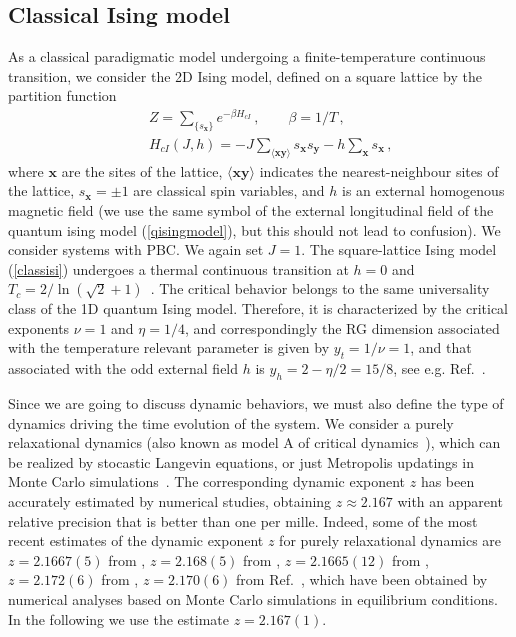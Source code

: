 \subsection{Classical Ising model}
\label{classmod}

As a classical paradigmatic model undergoing a finite-temperature
continuous transition, we consider the 2D Ising model,
defined on a square lattice by the partition function
\begin{eqnarray}
  &&Z = \sum_{\{s_{\bm x}\}} e^{-\beta H_{cI}}\,,\qquad
  \beta=1/T\,, \label{partfunc}\\
  &&H_{cI}(J,h) = - J \sum_{\langle
    {\bm x} {\bm y} \rangle} s_{\bm x} s_{\bm y} - h
  \sum_{\bm x}
  s_{\bm x}\,,
\label{classisi}  
\end{eqnarray}
where ${\bm x}$ are the sites of the lattice, ${\langle {\bm x} {\bm
    y} \rangle}$ indicates the nearest-neighbour sites of the lattice,
$s_{\bm x}=\pm 1$ are classical spin variables, and $h$ is an external
homogenous magnetic field (we use the same symbol of the external
longitudinal field of the quantum ising model (\ref{qisingmodel}), but
this should not lead to confusion). We consider systems with PBC.  We
again set $J=1$.  The square-lattice Ising model (\ref{classisi})
undergoes a thermal continuous transition at $h=0$ and
$T_c=2/\ln(\sqrt{2}+1)$~\cite{Onsager-44}.  The critical behavior
belongs to the same universality class of the 1D quantum Ising
model. Therefore, it is characterized by the critical exponents
$\nu=1$ and $\eta=1/4$, and correspondingly the RG dimension
associated with the temperature relevant parameter is given by
$y_t=1/\nu=1$, and that associated with the odd external field $h$ is
$y_h = 2-\eta/2=15/8$, see e.g. Ref.~\cite{PV-02}.

Since we are going to discuss dynamic behaviors, we must also define
the type of dynamics driving the time evolution of the system.  We
consider a purely relaxational dynamics (also known as model A of
critical dynamics~\cite{HH-77,Ma-book}), which can be realized by stocastic
Langevin equations, or just Metropolis updatings in Monte Carlo
simulations~\cite{Metropolis:1953am}.  The corresponding dynamic
exponent $z$ has been accurately estimated by numerical studies,
obtaining $z\approx 2.167$ with an apparent relative precision that is
better than one per mille. Indeed, some of the most recent estimates
of the dynamic exponent $z$ for purely relaxational dynamics are
$z=2.1667(5)$ from \cite{NB-00}, $z=2.168(5)$ from \cite{WH-97},
$z=2.1665(12)$ from \cite{NB-96}, $z=2.172(6)$ from \cite{G-95},
$z=2.170(6)$ from Ref.~\cite{CV-11}, which have been obtained by
numerical analyses based on Monte Carlo simulations in equilibrium
conditions. In the following we use the estimate $z=2.167(1)$.

